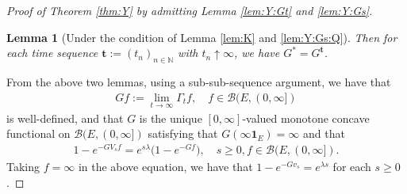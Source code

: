 \documentclass[12pt,a4paper]{amsart}
\numberwithin{equation}{section}
\theoremstyle{plain}
\newtheorem{lem}[thm]{Lemma}
\theoremstyle{definition}
\begin{document}
\begin{proof}[Proof of Theorem \ref{thm:Y} by admitting Lemma \ref{lem:Y:Gt} and \ref{lem:Y:Gs}]
\begin{lem}[Under the condition of Lemma \ref{lem:K} and \ref{lem:Y:Gs:Q}]
  Then for each time sequence $\mathbf t:= (t_n)_{n\in \mathbb N}$ with $ t_n \uparrow \infty$, we have $G^* = G^{\mathbf t}$.
\end{lem}
From the above two lemmas, using a sub-sub-sequence argument, we have that 
\begin{align}
  \label{eq:Y:1}
	Gf
  := \lim_{t\to \infty} \Gamma_tf, \quad f\in \mathcal B(E,(0,\infty])
\end{align}
is well-defined, and that $G$ is the unique $[0,\infty]$-valued monotone concave functional on $\mathcal B(E,(0,\infty])$ satisfying that $G(\infty \mathbf 1_E) = \infty$ and that
\begin{align}
  1 - e^{- G V_sf} = e^{s\lambda} \big(1- e^{- G f}\big),
  \quad s \geq 0, f \in \mathcal B(E, (0,\infty]).
\end{align}
Taking $f = \infty$ in the above equation, we have that $1 - e^{- Gv_s} = e^{\lambda s}$ for each $s\geq 0$.


\end{proof}
\end{document}
